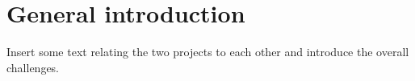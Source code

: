 \chapter{General introduction}\label{ch:general_introduction}

Insert some text relating the two projects to each other and introduce the overall challenges.